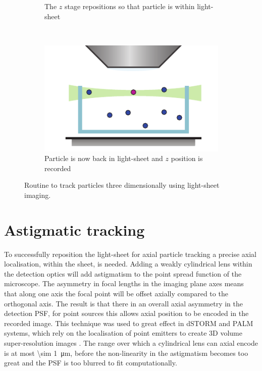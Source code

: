 \begin{figure}
\begin{subfigure}[t]{0.4\linewidth}
		\caption{The \(z\) stage repositions so that particle is within light-sheet}
		\label{fig:SPIMSPT3}
	\end{subfigure}~~
	\begin{subfigure}[t]{0.4\linewidth}
		\centering
		\includegraphics{Chapters/spt/Figs/PDF/tracking/4_piezo_track}
		\caption{Particle is now back in light-sheet and \(z\) position is recorded}
		\label{fig:SPIMSPT4}
	\end{subfigure}
	\caption{Routine to track particles three dimensionally using light-sheet imaging.}
	\label{fig:SPIMSPT}
\end{figure}

\section{Astigmatic tracking}

To successfully reposition the light-sheet for axial particle tracking a %
precise axial localisation, within the sheet, is needed.
Adding a weakly cylindrical lens within the detection optics will add astigmatism to the point spread function of the microscope.
The asymmetry in focal lengths in the imaging plane axes %
means that along one axis the focal point will be offset axially compared to the orthogonal axis.
The result is that there in an overall axial asymmetry in the detection PSF, for point sources this allows axial position to be encoded in the recorded image.
This technique was used to great effect in dSTORM and PALM systems, which rely on the localisation of point emitters to create 3D volume super-resolution images \cite{}.
The range over which a cylindrical lens can axial encode is at most \SI{\sim 1}{\micro\metre}, before the non-linearity in the astigmatism becomes too great and the PSF is too blurred to fit computationally.

